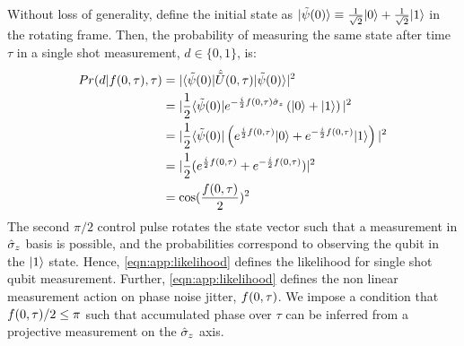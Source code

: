 Without loss of generality, define the initial state as  $| \tilde{\psi} (0) \rangle \equiv \frac{1}{\sqrt{2}} | 0 \rangle + \frac{1}{\sqrt{2}} | 1 \rangle$ in the rotating frame. Then, the probability of measuring the same state after time $\tau$ in a single shot measurement, $d \in \{0, 1\}$, is:
\begin{align} 
Pr(d | f(0, \tau), \tau) & = |\langle \tilde{\psi} (0) | \hat{\tilde{U}}(0, \tau) | \tilde{\psi} (0) \rangle|^2 \\
& = |\frac{1}{2} \langle \tilde{\psi} (0) | e^{-\frac{i}{2} f(0, \tau) \hat{\sigma}_{z} } \left(  | 0 \rangle + | 1 \rangle \right)|^2 \\
& = |\frac{1}{2}  \langle \tilde{\psi} (0) | \left( e^{\frac{i}{2} f(0, \tau) }| 0 \rangle + e^{-\frac{i}{2} f(0, \tau)}| 1 \rangle \right)|^2\\
& = |\frac{1}{2}  ( e^{\frac{i}{2} f(0, \tau)} + e^{-\frac{i}{2} f(0, \tau)} )|^2\\
& = \cos(\frac{f(0, \tau)}{2})^2 \label{eqn:app:likelihood}
\end{align}
The second $\pi/2$ control pulse rotates the state vector such that a measurement in $\hat{\sigma}_{z}$ basis is possible, and the probabilities correspond to observing the qubit in the   $| 1 \rangle$ state. Hence, \cref{eqn:app:likelihood} defines the likelihood for single shot qubit measurement. Further, \cref{eqn:app:likelihood} defines the non linear measurement action on phase noise jitter, $f(0, \tau)$.  We impose a condition that $f(0, \tau)/2 \leq \pi$  such that accumulated phase over $\tau$ can be inferred from a projective measurement on the $\hat{\sigma}_{z}$ axis. 



\newpage
